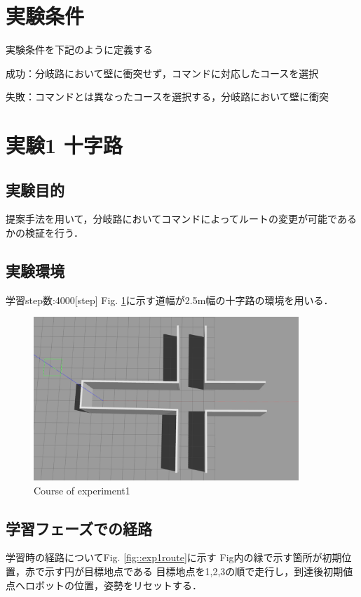 \section{実験条件}
実験条件を下記のように定義する

成功：分岐路において壁に衝突せず，コマンドに対応したコースを選択

失敗：コマンドとは異なったコースを選択する，分岐路において壁に衝突

\newpage
\section{実験1 十字路}
\subsection{実験目的}
提案手法を用いて，分岐路においてコマンドによってルートの変更が可能であるかの検証を行う．
\subsection{実験環境}
学習step数:4000[step]
Fig. \ref{fig::zyuzi}に示す道幅が2.5m幅の十字路の環境を用いる．
\begin{figure}[ht]
    \centering
    \includegraphics[width = 10cm]{./figs/zyuuziyoko.png}
    \caption{Course of experiment1}
    \label{fig::zyuzi}
\end{figure}

\newpage
\subsection{学習フェーズでの経路}
学習時の経路についてFig. \ref{fig::exp1route}に示す
Fig内の緑で示す箇所が初期位置，赤で示す円が目標地点である
目標地点を1,2,3の順で走行し，到達後初期値点へロボットの位置，姿勢をリセットする．

